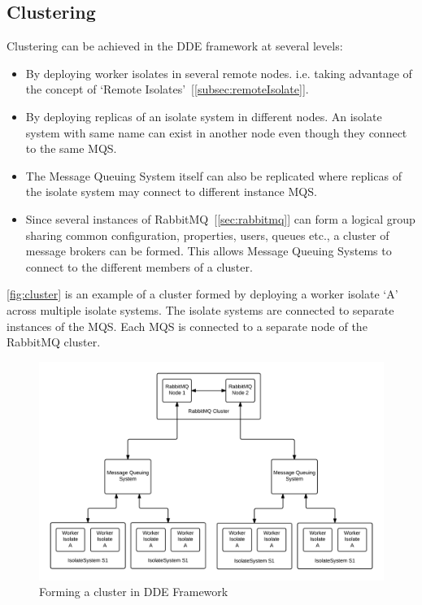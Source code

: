 \subsection{Clustering}
  Clustering can be achieved in the DDE framework at several levels:
  \begin{itemize}
  \item By deploying worker isolates in several remote nodes. i.e. taking advantage of the concept of ‘Remote Isolates’~[\autoref{subsec:remoteIsolate}].
  \item By deploying replicas of an isolate system in different nodes. An isolate system with same name can exist in another node even though they connect to the same MQS.
  \item The Message Queuing System itself can also be replicated where replicas of the isolate system may connect to different instance MQS.
  \item Since several instances of RabbitMQ~[\autoref{sec:rabbitmq}] can form a logical group sharing common configuration, properties, users, queues etc., a cluster of message brokers can be formed. This allows Message Queuing Systems to connect to the different members of a cluster.
  \end{itemize}

  \autoref{fig:cluster} is an example of a cluster formed by deploying a worker isolate ‘A’ across multiple isolate systems. The isolate systems are connected to separate instances of the MQS. Each MQS is connected to a separate node of the RabbitMQ cluster.

\begin{figure}[H]
  \centering
  \includegraphics[width=1\textwidth]{figures/cluster}
  \caption[Forming a cluster in DDE Framework]{Forming a cluster in DDE Framework}
  \label{fig:cluster}
\end{figure}

